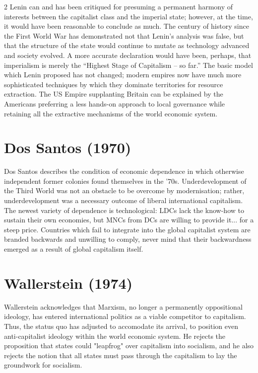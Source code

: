 \documentclass[letterpaper,12pt]{article}
\begin{document}
\begin {multicols}{2}
Lenin can and has been critiqued for presuming a permanent harmony of interests between the capitalist class and the imperial state; however, at the time, it would have been reasonable to conclude as much. The century of history since the First World War has demonstrated not that Lenin's analysis was false, but that the structure of the state would continue to mutate as technology advanced and society evolved. A more accurate declaration would have been, perhaps, that imperialism is merely the ``Highest Stage of Capitalism – so far.'' The basic model which Lenin proposed has not changed; modern empires now have much more sophisticated techniques by which they dominate territories for resource extraction. The US Empire supplanting Britain can be explained by the Americans preferring a less hands-on approach to local governance while retaining all the extractive mechanisms of the world economic system.


\section*{Dos Santos (1970)}

Dos Santos describes the condition of economic dependence in which otherwise independent former colonies found themselves in the '70s. Underdevelopment of the Third World was not an obstacle to be overcome by modernisation; rather, underdevelopment was a necessary outcome of liberal international capitalism. The newest variety of dependence is technological: LDCs lack the know-how to sustain their own economies, but MNCs from DCs are willing to provide it... for a steep price. Countries which fail to integrate into the global capitalist system are branded backwards and unwilling to comply, never mind that their backwardness emerged as a result of global capitalism itself.

\section*{Wallerstein (1974)}

Wallerstein acknowledges that Marxism, no longer a permanently oppositional ideology, has entered international politics as a viable competitor to capitalism. Thus, the status quo has adjusted to accomodate its arrival, to position even anti-capitalist ideology within the world economic system. He rejects the proposition that states could "leapfrog" over capitalism into socialism, and he also rejects the notion that all states must pass through the capitalism to lay the groundwork for socialism.


\end{multicols}
\end{document}
